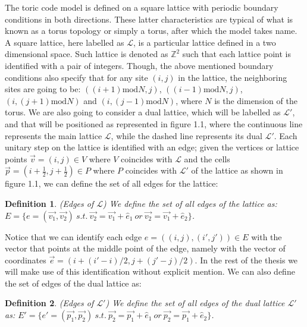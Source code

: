 \documentclass{Configuration_Files/PoliMi3i_thesis}
\newtheorem{definition}{Definition}[chapter]
\begin{document}
The toric code model is defined on a square lattice with periodic boundary conditions in both directions. These latter characteristics are typical of what is known as a torus topology or simply a torus, after which the model takes name.\newline
A square lattice, here labelled as $\mathcal{L}$, is a particular lattice defined in a two dimensional space. Such lattice is denoted as $\mathbb{Z}^{2}$ such that each lattice point is identified with a pair of integers. Though, the above mentioned boundary conditions also specify that for any site $(i, j)$ in the lattice, the neighboring sites are going to be: $((i+1)\mathrm{mod}N, j)$, $((i-1)\mathrm{mod} N, j)$, $(i, (j+1)\mathrm{mod}N)$ and $(i, (j-1)\mathrm{mod}N)$, where $N$ is the dimension of the torus. We are also going to consider a dual lattice, which will be labelled as $\mathcal{L}'$, and that will be positioned as represented in figure 1.1, where the continuous line represents the main lattice $\mathcal{L}$, while the dashed line represents its dual $\mathcal{L'}$.  \newline	
Each unitary step on the lattice is identified with an edge; given the vertices or lattice points $\vec{v}=(i,j) \in V$ where $V$ coincides with $\mathcal{L}$ and the cells $\vec{p}=(i+\frac{1}{2},j+\frac{1}{2})\in P$ where $P$ coincides with $ \mathcal{L'}$ of the lattice as shown in figure 1.1, we can define the set of all edges for the lattice:

\begin{definition}(Edges of $\mathcal{L}$)
	We define the set of all edges of the lattice as: $E = \{e=(\vec{v_1},\vec{v_2}) \ s.t. \ \vec{v_2}=\vec{v_1}+\hat{e}_1 \ or \ \vec{v_2}=\vec{v_1}+\hat{e}_2 \}$.
\end{definition}

Notice that we can identify each edge $e=((i,j),(i',j')) \in E$ with the vector that points at the middle point of the edge, namely with the vector of coordinates $\vec{e}=(i + (i'-i)/2, j + (j'-j)/2)$. In the rest of the thesis we will make use of this identification without explicit mention. We can also define the set of edges of the dual lattice as:

\begin{definition}(Edges of $\mathcal{L'}$)
	We define the set of all edges of the dual lattice $\mathcal{L'}$ as: $E' = \{e'=(\vec{p_1},\vec{p_2}) \ s.t. \ \vec{p_2}=\vec{p_1}+\hat{e}_1 \ or \ \vec{p_2}=\vec{p_1}+\hat{e}_2 \}$.
\end{definition}
\end{document}
